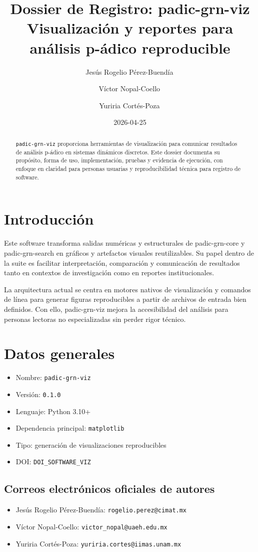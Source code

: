\documentclass[11pt]{article}
\title{Dossier de Registro: padic-grn-viz\\\large Visualización y reportes para análisis p-ádico reproducible}
\author{
Jesús Rogelio Pérez-Buendía\,\orcidlink{0000-0002-7739-4779}
\and
Víctor Nopal-Coello\,\orcidlink{0000-0003-2608-3636}
\and
Yuriria Cortés-Poza\,\orcidlink{0000-0003-1856-9206}
}
\date{2026-04-25}
\begin{document}
\maketitle
\begin{abstract}
\texttt{padic-grn-viz} proporciona herramientas de visualización para comunicar resultados de análisis p-ádico en sistemas dinámicos discretos. Este dossier documenta su propósito, forma de uso, implementación, pruebas y evidencia de ejecución, con enfoque en claridad para personas usuarias y reproducibilidad técnica para registro de software.
\end{abstract}
\tableofcontents
\newpage

\section{Introducción}
Este software transforma salidas numéricas y estructurales de padic-grn-core y padic-grn-search en gráficos y artefactos visuales reutilizables. Su papel dentro de la suite es facilitar interpretación, comparación y comunicación de resultados tanto en contextos de investigación como en reportes institucionales.

La arquitectura actual se centra en motores nativos de visualización y comandos de línea para generar figuras reproducibles a partir de archivos de entrada bien definidos. Con ello, padic-grn-viz mejora la accesibilidad del análisis para personas lectoras no especializadas sin perder rigor técnico.

\section{Datos generales}
\begin{itemize}
  \item Nombre: \texttt{padic-grn-viz}
  \item Versión: \texttt{0.1.0}
  \item Lenguaje: Python 3.10+
  \item Dependencia principal: \texttt{matplotlib}
  \item Tipo: generación de visualizaciones reproducibles
  \item DOI: \texttt{DOI\_SOFTWARE\_VIZ}
\end{itemize}

\subsection{Correos electrónicos oficiales de autores}
\begin{itemize}
  \item Jesús Rogelio Pérez-Buendía: \texttt{rogelio.perez@cimat.mx}
  \item Víctor Nopal-Coello: \texttt{victor\_nopal@uaeh.edu.mx}
  \item Yuriria Cortés-Poza: \texttt{yuriria.cortes@iimas.unam.mx}
\end{itemize}
\end{document}
